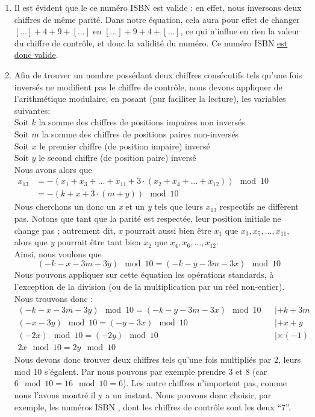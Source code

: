 \documentclass[10p,a4paper]{scrartcl}
\begin{document}
\begin{enumerate}
	\item	Il est évident que le ce numéro ISBN est valide : en effet, nous inversons deux chiffres de même parité. Dans notre équation, cela aura pour effet de changer $[...] + 4 + 9 +[...]$ en $[...] + 9 + 4 +[...]$, ce qui n'influe en rien la valeur du chiffre de contrôle, et donc la validité du numéro. Ce numéro ISBN \underline{est donc valide}.
	
	\item  	Afin de trouver un nombre possédant deux chiffres consécutifs tels qu'une fois inversés ne modifient pas le chiffre de contrôle, nous devons appliquer de l'arithmétique modulaire, en posant (pur faciliter la lecture), les variables suivantes:\\
			Soit $k$ la somme des chiffres de positions impaires non inversés\\
			Soit $m$ la somme des chiffres de positions paires non-inversés\\
			Soit $x$ le premier chiffre (de position impaire) inversé\\
			Soit $y$ le second chiffre (de position paire) inversé\\
			Nous avons alors que \\
			$\begin{array}{ll}
				x_{13} 	&= -(x_1+x_3+...+x_{11} + 3\cdot(x_2+x_4+...+x_{12})) \mod 10\\
						&= -(k+x+3\cdot(m+y)) \mod 10
			\end{array}$\\
			Nous cherchons un donc un \textit{x} et un \textit{y} tels que leurs $x_{13}$ respectifs ne diffèrent pas. Notons que tant que la parité est respectée, leur position initiale ne change pas ; autrement dit, \textit{x} pourrait aussi bien être $x_1$ que $x_3,x_5,...,x_{11}$, alors que \textit{y} pourrait être tant bien $x_2$ que $x_4,x_6,...,x_{12}$.\\
			Ainsi, nous voulons que 
			\begin{equation*}
				(-k-x-3m-3y) \mod 10 = (-k-y-3m-3x)\mod 10
			\end{equation*}
			Nous pouvons appliquer sur cette équation les opérations standards, à l'exception de la division (ou de la multiplication par un réel non-entier). Nous trouvons donc :\\
			$\begin{array}{rcl}
			(-k-x-3m-3y) \mod 10 = (-k-y-3m-3x) \mod 10 &  & |+k+3m\\
			(-x-3y) \mod 10 = (-y-3x)\mod 10 			&  & |+x+y\\
			(-2x) \mod 10 = (-2y) \mod 10				&  & |\times (-1)\\
			2x \mod 10 = 2y\mod 10
			\end{array}$\\
			Nous devons donc trouver deux chiffres tels qu'une fois multipliés par 2, leurs mod 10 s'égalent. Par nous pouvons par exemple prendre 3 et 8 (car $6 \mod 10 = 16\mod 10 = 6$). Les autre chiffres n'importent pas, comme nous l'avons montré il y a un instant. Nous pouvons donc choisir, par exemple, les numéros ISBN
			, dont les chiffres de contrôle sont les deux \enquote{7}.
			

\end{enumerate}
\end{document}
